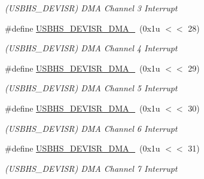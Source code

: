 \begin{DoxyCompactItemize}
\begin{DoxyCompactList}\small\item\em (U\+S\+B\+H\+S\+\_\+\+D\+E\+V\+I\+SR) D\+MA Channel 3 Interrupt \end{DoxyCompactList}\item 
\mbox{\label{group__SAME70__USBHS_gac6ca63d05ec206ab5c6bdb900a56143d}} 
\#define \mbox{\hyperlink{group__SAME70__USBHS_gac6ca63d05ec206ab5c6bdb900a56143d}{U\+S\+B\+H\+S\+\_\+\+D\+E\+V\+I\+S\+R\+\_\+\+D\+M\+A\+\_}}~(0x1u $<$$<$ 28)
\begin{DoxyCompactList}\small\item\em (U\+S\+B\+H\+S\+\_\+\+D\+E\+V\+I\+SR) D\+MA Channel 4 Interrupt \end{DoxyCompactList}\item 
\mbox{\label{group__SAME70__USBHS_gafaa3187461761534a58264179fc9e76c}} 
\#define \mbox{\hyperlink{group__SAME70__USBHS_gafaa3187461761534a58264179fc9e76c}{U\+S\+B\+H\+S\+\_\+\+D\+E\+V\+I\+S\+R\+\_\+\+D\+M\+A\+\_}}~(0x1u $<$$<$ 29)
\begin{DoxyCompactList}\small\item\em (U\+S\+B\+H\+S\+\_\+\+D\+E\+V\+I\+SR) D\+MA Channel 5 Interrupt \end{DoxyCompactList}\item 
\mbox{\label{group__SAME70__USBHS_ga27613764636a9e15d4140ad5bf440774}} 
\#define \mbox{\hyperlink{group__SAME70__USBHS_ga27613764636a9e15d4140ad5bf440774}{U\+S\+B\+H\+S\+\_\+\+D\+E\+V\+I\+S\+R\+\_\+\+D\+M\+A\+\_}}~(0x1u $<$$<$ 30)
\begin{DoxyCompactList}\small\item\em (U\+S\+B\+H\+S\+\_\+\+D\+E\+V\+I\+SR) D\+MA Channel 6 Interrupt \end{DoxyCompactList}\item 
\mbox{\label{group__SAME70__USBHS_ga6e90562dc53a50c599f9d12f10fb3563}} 
\#define \mbox{\hyperlink{group__SAME70__USBHS_ga6e90562dc53a50c599f9d12f10fb3563}{U\+S\+B\+H\+S\+\_\+\+D\+E\+V\+I\+S\+R\+\_\+\+D\+M\+A\+\_}}~(0x1u $<$$<$ 31)
\begin{DoxyCompactList}\small\item\em (U\+S\+B\+H\+S\+\_\+\+D\+E\+V\+I\+SR) D\+MA Channel 7 Interrupt \end{DoxyCompactList}\item 

\end{DoxyCompactItemize}
